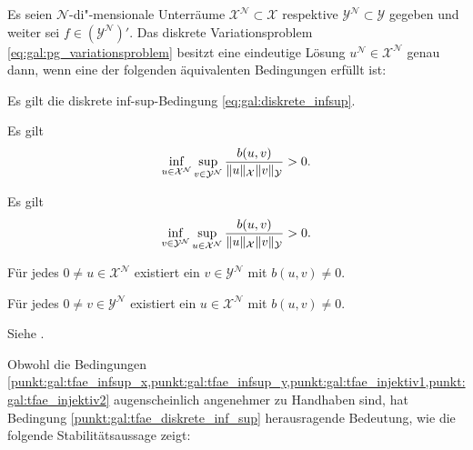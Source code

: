 \begin{Satz}
    \label{satz:gal:wohldefiniertheit}
    Es seien $\mathcal N$-di"-mensionale Unterräume $\mathcal X^{\mathcal N} \subset \mathcal X$ respektive $\mathcal Y^{\mathcal N} \subset \mathcal Y$ gegeben und weiter sei $f \in (\mathcal Y^{\mathcal N})'$.
    Das diskrete Variationsproblem \cref{eq:gal:pg_variationsproblem} besitzt eine eindeutige Lösung $u^{\mathcal N} \in \mathcal X^{\mathcal N}$ genau dann, wenn eine der folgenden äquivalenten Bedingungen erfüllt ist:
    \begin{thmenumerate}
        \item \label{punkt:gal:tfae_diskrete_inf_sup} Es gilt die diskrete inf-sup-Bedingung \cref{eq:gal:diskrete_infsup}.
        \item \label{punkt:gal:tfae_infsup_x} Es gilt
            \begin{equation}
                \inf_{u \in \mathcal X^{\mathcal N}} \sup_{v \in \mathcal Y^{\mathcal N}} \frac{b(u, v)}{\lVert u\rVert_{\mathcal X} \lVert v\rVert_{\mathcal Y}} > 0.
            \end{equation}
        \item \label{punkt:gal:tfae_infsup_y} Es gilt
            \begin{equation}
                \inf_{v \in \mathcal Y^{\mathcal N}} \sup_{u \in \mathcal X^{\mathcal N}} \frac{b(u, v)}{\lVert u\rVert_{\mathcal X} \lVert v\rVert_{\mathcal Y}} > 0.
            \end{equation}
        \item \label{punkt:gal:tfae_injektiv1} Für jedes $0 \neq u \in \mathcal X^{\mathcal N}$ existiert ein $v \in \mathcal Y^{\mathcal N}$ mit $b(u, v) \neq 0$.
        \item \label{punkt:gal:tfae_injektiv2} Für jedes $0 \neq v \in \mathcal Y^{\mathcal N}$ existiert ein $u \in \mathcal X^{\mathcal N}$ mit $b(u, v) \neq 0$.
    \end{thmenumerate}

    \begin{Beweis}
        Siehe \cite[Theorem 3.1, Proposition 3.1]{Nochetto:2009il}.
    \end{Beweis}
\end{Satz}

Obwohl die Bedingungen \cref{punkt:gal:tfae_infsup_x,punkt:gal:tfae_infsup_y,punkt:gal:tfae_injektiv1,punkt:gal:tfae_injektiv2} augenscheinlich angenehmer zu Handhaben sind, hat Bedingung \cref{punkt:gal:tfae_diskrete_inf_sup} herausragende Bedeutung, wie die folgende Stabilitätsaussage zeigt:

